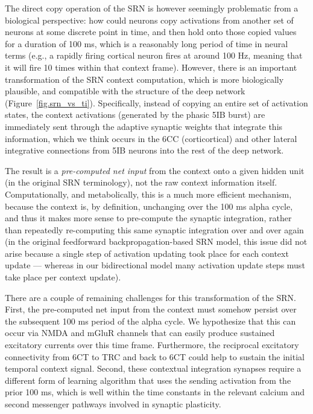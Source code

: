 The direct copy operation of the SRN is however seemingly problematic from a biological perspective: how could neurons copy activations from another set of neurons at some discrete point in time, and then hold onto those copied values for a duration of 100 ms, which is a reasonably long period of time in neural terms (e.g., a rapidly firing cortical neuron fires at around 100 Hz, meaning that it will fire 10 times within that context frame).  However, there is an important transformation of the SRN context computation, which is more biologically plausible, and compatible with the structure of the deep network (Figure~\ref{fig.srn_vs_ti}). Specifically, instead of copying an entire set of activation states, the context activations (generated by the phasic 5IB burst) are immediately sent through the adaptive synaptic weights that integrate this information, which we think occurs in the 6CC (corticortical) and other lateral integrative connections from 5IB neurons into the rest of the deep network.

The result is a {\em pre-computed net input} from the context onto a given hidden unit (in the original SRN terminology), not the raw context information itself.  Computationally, and metabolically, this is a much more efficient mechanism, because the context is, by definition, unchanging over the 100 ms alpha cycle, and thus it makes more sense to pre-compute the synaptic integration, rather than repeatedly re-computing this same synaptic integration over and over again (in the original feedforward backpropagation-based SRN model, this issue did not arise because a single step of activation updating took place for each context update --- whereas in our bidirectional model many activation update steps must take place per context update).

There are a couple of remaining challenges for this transformation of the SRN.  First, the pre-computed net input from the context must somehow persist over the subsequent 100 ms period of the alpha cycle.  We hypothesize that this can occur via NMDA and mGluR channels that can easily produce sustained excitatory currents over this time frame.  Furthermore, the reciprocal excitatory connectivity from 6CT to TRC and back to 6CT could help to sustain the initial temporal context signal.  Second, these contextual integration synapses require a different form of learning algorithm that uses the sending activation from the prior 100 ms, which is well within the time constants in the relevant calcium and second messenger pathways involved in synaptic plasticity.


